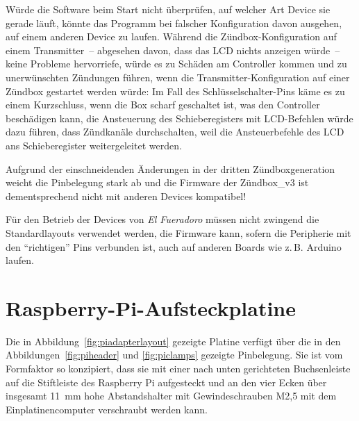 \documentclass[paper=a4, parskip, numbers=noenddot, toc=listof, headsepline]{scrbook}
\newcommand{\anlage}{\emph{El Fueradoro}}
\begin{document}
			Würde die Software beim Start nicht überprüfen, auf welcher Art Device sie gerade läuft, könnte das Programm bei falscher Konfiguration davon ausgehen, auf einem anderen Device zu laufen. Während die Zündbox-Konfiguration auf einem Transmitter~-- abgesehen davon, dass das LCD nichts anzeigen würde~-- keine Probleme hervorriefe, würde es zu Schäden am Controller kommen und zu unerwünschten Zündungen führen, wenn die Transmitter-Konfiguration auf einer Zündbox gestartet werden würde: Im Fall des Schlüsselschalter-Pins käme es  zu einem Kurzschluss, wenn die Box scharf geschaltet ist, was den Controller beschädigen kann, die Ansteuerung des Schieberegisters mit LCD-Befehlen würde dazu führen, dass Zündkanäle durchschalten, weil die Ansteuerbefehle des LCD ans Schieberegister weitergeleitet werden.

			Aufgrund der einschneidenden Änderungen in der dritten Zündboxgeneration weicht die Pinbelegung stark ab und die Firmware der Zündbox\_v3 ist dementsprechend nicht mit anderen Devices kompatibel!

			Für den Betrieb der Devices von {\anlage} müssen nicht zwingend die Standardlayouts verwendet werden, die Firmware kann, sofern die Peripherie mit den \enquote{richtigen} Pins verbunden ist, auch auf anderen Boards wie z.\,B. Arduino laufen.

		\section{Raspberry-Pi-Aufsteckplatine}

			Die in Abbildung~\ref{fig:piadapterlayout} gezeigte Platine verfügt über die in den Abbildungen~\ref{fig:piheader} und \ref{fig:piclamps} gezeigte Pinbelegung. Sie ist vom Formfaktor so konzipiert, dass sie mit einer nach unten gerichteten Buchsenleiste auf die Stiftleiste des Raspberry Pi aufgesteckt und an den vier Ecken über insgesamt \SI{11}{\milli\metre} hohe Abstandshalter mit Gewindeschrauben M2,5 mit dem Einplatinencomputer verschraubt werden kann.
\end{document}
